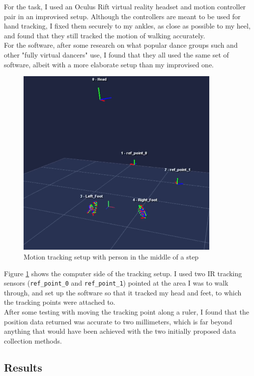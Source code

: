\documentclass[12pt, a4paper]{article}
\begin{document}
For the task, I used an Oculus Rift virtual reality headset and motion
controller pair in an improvised setup. Although the controllers are meant to be
used for hand tracking, I fixed them securely to my ankles, as close as possible
to my heel, and found that they still tracked the motion of walking accurately.
\\

For the software, after some research on what popular dance groups such and
other "fully virtual dancers" use, I found that they all used the same set of
software, albeit with a more elaborate setup than my improvised one.

\begin{figure}[H]
    \centering
    \includegraphics[width=10cm]{mocap_software}
    \caption{Motion tracking setup with person in the middle of a step}
    \label{mocap}
\end{figure}

Figure \ref{mocap} shows the computer side of the tracking setup. I used two IR
tracking sensors (\texttt{ref\_point\_0} and \texttt{ref\_point\_1}) pointed at
the area I was to walk through, and set up the software so that it tracked my
head and feet, to which the tracking points were attached to. \\

After some testing with moving the tracking point along a ruler, I found that
the position data returned was accurate to two millimeters, which is far beyond
anything that would have been achieved with the two initially proposed data
collection methods.

\subsection{Results}
\end{document}
